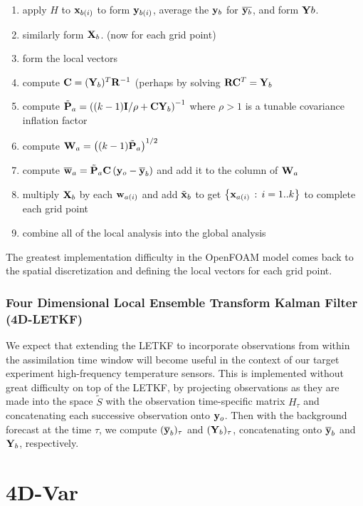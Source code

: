 \documentclass[12pt]{report}
\begin{document}
\begin{enumerate}
\item apply $H$ to $\mathbf{x}_{b(i)}$ to form $\mathbf{y}_{b(i)}$, average the $\mathbf{y}_b$ for $\overline{\mathbf{y}_b}$, and form $\mathbf{Y} b$.
\item similarly form $\mathbf{X}_b$. (now for each grid point)
\item form the local vectors
\item compute $\mathbf{C}=(\mathbf{Y}_b)^T\mathbf{R}^{-1}$ (perhaps by solving $\mathbf{R} \mathbf{C}^T = \mathbf{Y}_b$
\item compute $\tilde{\mathbf{P}}_a = \left( (k-1)\mathbf{I} / \rho + \mathbf{C} \mathbf{Y} _b \right ) ^{-1}$ where $\rho > 1$ is a tunable covariance inflation factor
\item compute $\mathbf{W}_a = \left ( (k-1) \tilde{\mathbf{P}} _a \right ) ^{1/2}$
\item compute $\overline{\mathbf{w}} _a  = \tilde{\mathbf{P}}_a \mathbf{C} \left ( \mathbf{y}_o - \overline{\mathbf{y}} _b \right )$ and add it to the column of $\mathbf{W}_a$
\item multiply $\mathbf{X}_b$ by each $\mathbf{w}_{a(i)}$ and add $\tilde{\mathbf{x}}_b$ to get $\left\{ \mathbf{x}_{a(i)}\,:\,i=1..k\right \}$ to complete each grid point
\item combine all of the local analysis into the global analysis
\end{enumerate}

The greatest implementation difficulty in the OpenFOAM model comes back to the spatial discretization and defining the local vectors for each grid point.

\subsubsection{Four Dimensional Local Ensemble Transform Kalman Filter (4D-LETKF)}

We expect that extending the LETKF to incorporate observations from within the assimilation time window will become useful in the context of our target experiment high-frequency temperature sensors.
This is implemented without great difficulty on top of the LETKF, by projecting observations as they are made into the space $\tilde{S}$ with the observation time-specific matrix $H_\tau$ and concatenating each successive observation onto $\mathbf{y}_o$.
Then with the background forecast at the time $\tau$, we compute $( \overline{\mathbf{y}}_b )_\tau$ and $ (\mathbf{Y} _b ) _\tau$, concatenating onto $\overline{\mathbf{y}}_b$ and $\mathbf{Y}_b$, respectively.

\section{4D-Var}
\end{document}
